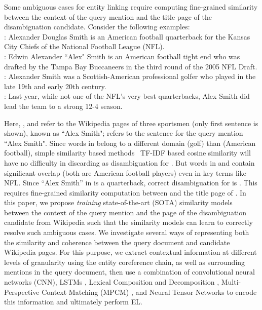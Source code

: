\documentclass[letterpaper]{article} \usepackage{aaai18}  \usepackage{times}  \usepackage{helvet}  \usepackage{courier}  \usepackage{url}  \usepackage{graphicx}  \frenchspacing  \setlength{\pdfpagewidth}{8.5in}  \setlength{\pdfpageheight}{11in}  \usepackage{latexsym}
\begin{document}
Some ambiguous cases for entity linking require computing fine-grained similarity between the context of the query mention and the title page of the disambiguation candidate. Consider the following examples:\\
: Alexander Douglas Smith is an American football quarterback for the Kansas City Chiefs of the National Football League (NFL).\\
: Edwin Alexander ``Alex" Smith is an American football tight end who was drafted by the Tampa Bay Buccaneers in the third round of the 2005 NFL Draft.\\
: Alexander Smith was a Scottish-American professional golfer who played in the late 19th and early 20th century.\\
: Last year, while not one of the NFL’s very best quarterbacks, Alex Smith did lead the team to a strong 12-4 season.

Here, ,  and  refer to the Wikipedia pages of three sportsmen (only first sentence is shown), known as ``Alex Smith";  refers to the sentence for the query mention ``Alex Smith". Since words in  belong to a different domain (golf) than  (American football), simple similarity based methods \eg\ TF-IDF based cosine similarity will have no difficulty in discarding  as disambiguation for . But words in  and  contain significant overlap (both are American football players) even in key terms like NFL. Since ``Alex Smith'' in  is a quarterback, correct disambiguation for  is . This requires fine-grained similarity computation between  and the title page of . In this paper, we propose \textit{training} state-of-the-art (SOTA) similarity models between the context of the query mention and the page of the disambiguation candidate from Wikipedia such that the similarity models can learn to correctly resolve such ambiguous cases. We investigate several ways of representing both the similarity and coherence between the query document and candidate Wikipedia pages. For this purpose, we extract contextual information at different levels of granularity using the entity coreference chain, as well as surrounding mentions in the query document, then use a combination of convolutional neural networks (CNN), LSTMs \cite{hochreiter1997long}, Lexical Composition and Decomposition \cite{wang2016sentence},  Multi-Perspective Context Matching (MPCM) \cite{wang2016multi}, and Neural Tensor Networks  \cite{socher2013reasoning,socher2013tensor} to encode this information and ultimately perform EL.
\end{document}
